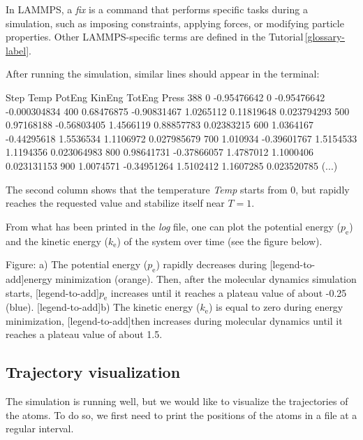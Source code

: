 \begin{tcolorbox}[colback=mylightblue!5!white,colframe=mylightblue!75!black,title=What is a fix?]

\vspace{0.25cm} \noindent In LAMMPS, a \textit{fix} is a command that performs specific tasks during a simulation,
such as imposing constraints, applying forces, or modifying particle properties.
Other LAMMPS-specific terms are defined in the Tutorial\,\ref{glossary-label}.
\end{tcolorbox}

\noindent After running the simulation, similar lines should appear in the terminal:

\begin{lcverbatim}
Step   Temp          PotEng         KinEng       TotEng        Press     
388    0             -0.95476642    0           -0.95476642   -0.000304834
400    0.68476875    -0.90831467    1.0265112    0.11819648    0.023794293  
500    0.97168188    -0.56803405    1.4566119    0.88857783    0.02383215   
600    1.0364167     -0.44295618    1.5536534    1.1106972     0.027985679  
700    1.010934      -0.39601767    1.5154533    1.1194356     0.023064983  
800    0.98641731    -0.37866057    1.4787012    1.1000406     0.023131153  
900    1.0074571     -0.34951264    1.5102412    1.1607285     0.023520785 
(...)
\end{lcverbatim}

\noindent The second column shows that the temperature \textit{Temp}
starts from 0, but rapidly reaches the
requested value and stabilize itself near $T=1$. 

\vspace{0.25cm} \noindent From what has been printed in the \textit{log} file, one can
plot the potential energy ($p_\text{e}$)
and the kinetic energy ($k_\text{e}$) of
the system over time (see the figure below).

\vspace{0.25cm} Figure: a) The potential energy ($p_\text{e}$) rapidly decreases during
[legend-to-add]energy minimization (orange). Then, after the molecular dynamics simulation starts,
[legend-to-add]$p_\text{e}$ increases until it reaches a plateau value of about -0.25 (blue). 
[legend-to-add]b) The kinetic energy ($k_\text{e}$) is equal to zero during energy minimization,
[legend-to-add]then increases during molecular dynamics until it reaches a plateau value of about 1.5.

\subsection{Trajectory visualization}
\noindent The simulation is running well, but we would like to
visualize the trajectories of the atoms. To do so, we first need
to print the positions of the atoms in a file at a regular interval.

